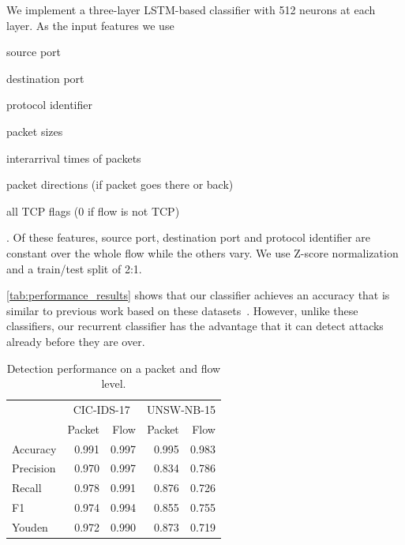 \documentclass[conference]{IEEEtran}
\begin{document}
We implement a three-layer LSTM-based classifier with 512 neurons at each layer. As the input features we use \begin{itemize*}
\item source port
\item destination port
\item protocol identifier
\item packet sizes
\item interarrival times of packets
\item packet directions (if packet goes there or back)
\item all TCP flags (0 if flow is not TCP)
\end{itemize*}. Of these features, source port, destination port and protocol identifier are constant over the whole flow while the others vary.
We use Z-score normalization and a train/test split of 2:1.

\autoref{tab:performance_results} shows that our classifier achieves an accuracy that is similar to previous work based on these datasets~\cite{meghdouri_analysis_2018,Bachl2019}. However, unlike these classifiers, our recurrent classifier has the advantage that it can detect attacks already before they are over.

\begin{table}
\caption{Detection performance on a packet and flow level.} \label{tab:performance_results}
\centering
\begin{tabular}{l r r r r} \toprule
& \multicolumn{2}{c}{CIC-IDS-17} & \multicolumn{2}{c}{UNSW-NB-15} \\
	&	Packet	&	Flow	&	Packet	&	Flow	\\	\midrule
Accuracy	&	0.991	&	0.997	&	0.995	&	0.983	\\	
Precision	&	0.970	&	0.997	&	0.834	&	0.786	\\	
Recall	&	0.978	&	0.991	&	0.876	&	0.726	\\	
F1	&	0.974	&	0.994	&	0.855	&	0.755	\\	
Youden	&	0.972	&	0.990	&	0.873	&	0.719	\\	


\bottomrule
\end{tabular}
\end{table}
\end{document}
